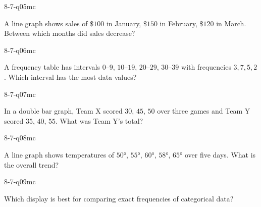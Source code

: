 \begin{practiceQuestion}{8-7-q05}{mc}
\begin{questionText}
A line graph shows sales of $\$100$ in January, $\$150$ in February, $\$120$ in March. Between which months did sales decrease?
\end{questionText}
\end{practiceQuestion}

\begin{practiceQuestion}{8-7-q06}{mc}
\begin{questionText}
A frequency table has intervals $0$--$9$, $10$--$19$, $20$--$29$, $30$--$39$ with frequencies $3, 7, 5, 2$. Which interval has the most data values?
\end{questionText}
\end{practiceQuestion}

\begin{practiceQuestion}{8-7-q07}{mc}
\begin{questionText}
In a double bar graph, Team X scored $30$, $45$, $50$ over three games and Team Y scored $35$, $40$, $55$. What was Team Y's total?
\end{questionText}
\end{practiceQuestion}

\begin{practiceQuestion}{8-7-q08}{mc}
\begin{questionText}
A line graph shows temperatures of $50°$, $55°$, $60°$, $58°$, $65°$ over five days. What is the overall trend?
\end{questionText}
\end{practiceQuestion}

\begin{practiceQuestion}{8-7-q09}{mc}
\begin{questionText}
Which display is best for comparing exact frequencies of categorical data?
\end{questionText}
\end{practiceQuestion}

